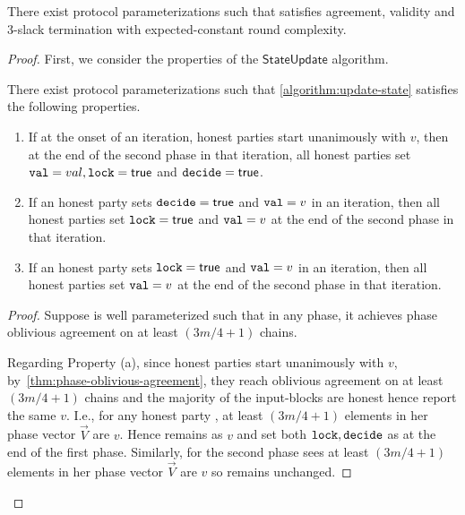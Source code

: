 \begin{theorem} \label{thm:chain-king-consensus}
    There exist protocol parameterizations such that \chainKingConsensus satisfies agreement, validity and 3-slack termination with expected-constant round complexity.
\end{theorem}


\begin{proof}
    First, we consider the properties of the $\mathsf{StateUpdate}$ algorithm.

    \begin{claim} \label{claim:state-update-properties}
        There exist protocol parameterizations such that \cref{algorithm:update-state} satisfies the following properties.
        \begin{enumerate}[label=(\alph*),leftmargin=*,nosep]
            \item If at the onset of an iteration, honest parties start unanimously with $v$, then at the end of the second phase in that iteration, all honest parties set $\mathtt{val} = val, \mathtt{lock} = \mathsf{true}$ and $\mathtt{decide} = \mathsf{true}$.
            
            \item If an honest party \party sets $\mathtt{decide} = \mathsf{true}$ and $\mathtt{val} = v$ in an iteration, then all honest parties set $\mathtt{lock} = \mathsf{true}$ and $\mathtt{val} = v$ at the end of the second phase in that iteration.
            
            \item  If an honest party \party sets $\mathtt{lock} = \mathsf{true}$ and $\mathtt{val} = v$ in an iteration, then all honest parties set $\mathtt{val} = v$ at the end of the second phase in that iteration.
        \end{enumerate}
    \end{claim}

    \begin{proof}
        Suppose \chainKingConsensus is well parameterized such that in any phase, it achieves phase oblivious agreement on at least $(3m / 4 + 1)$ chains.

        Regarding Property (a), since honest parties start unanimously with $v$, by~\cref{thm:phase-oblivious-agreement}, they reach oblivious agreement on at least $(3m / 4 + 1)$ chains and the majority of the input-blocks are honest hence report the same $v$.
        I.e., for any honest party \party, at least $(3m / 4 + 1)$ elements in her phase vector $\vec{V}$ are $v$.
        Hence \party remains \val as $v$ and set both $\mathtt{lock}, \mathtt{decide}$ as \true at the end of the first phase.
        Similarly, for the second phase \party sees at least $(3m / 4 + 1)$ elements in her phase vector $\vec{V}$ are $v$ so \val remains unchanged.


\end{proof}
\end{proof}
